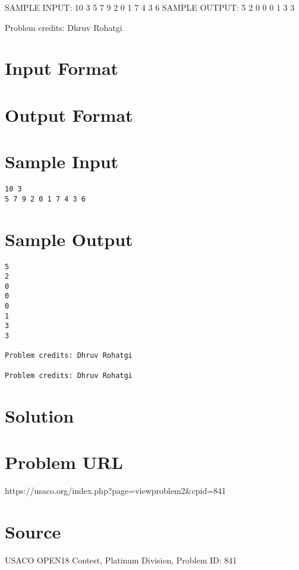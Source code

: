 \documentclass[12pt]{article}
\begin{document}
SAMPLE INPUT:
10 3
5 7 9 2 0 1 7 4 3 6
SAMPLE OUTPUT: 
5
2
0
0
0
1
3
3


Problem credits: Dhruv Rohatgi



\section*{Input Format}


\section*{Output Format}


\section*{Sample Input}
\begin{verbatim}
10 3
5 7 9 2 0 1 7 4 3 6
\end{verbatim}

\section*{Sample Output}
\begin{verbatim}
5
2
0
0
0
1
3
3

Problem credits: Dhruv Rohatgi

Problem credits: Dhruv Rohatgi
\end{verbatim}

\section*{Solution}


\section*{Problem URL}
https://usaco.org/index.php?page=viewproblem2&cpid=841

\section*{Source}
USACO OPEN18 Contest, Platinum Division, Problem ID: 841
\end{document}

